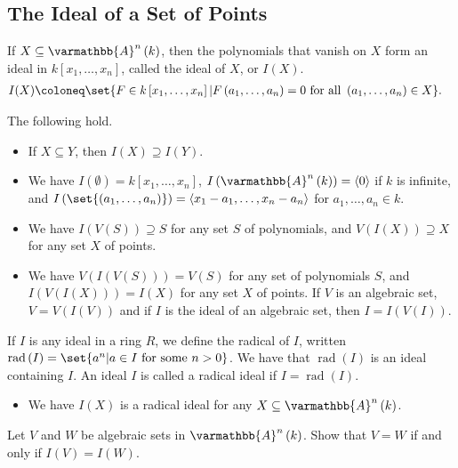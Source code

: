 \documentclass[10pt]{mypackage}
\renewcommand*{\mathbb}[1]{\varmathbb{#1}}
\newcommand{\A}{\mathbb{A}}
\begin{document}
\subsection{The Ideal of a Set of Points}%
\begin{definition}
  If $X\subseteq \A^n\left(k\right)$, then the polynomials that vanish on $X$ form an ideal in $k\left[x_1,\dots,x_n\right]$, called the ideal of $X$, or $I(X)$.
  \begin{align*}
    I(X) &\coloneq \set{F\in k\left[x_1,\dots,x_n\right] | F\left(a_1,\dots,a_n\right) = 0\text{ for all }\left(a_1,\dots,a_n\right)\in X}.
  \end{align*}
\end{definition}
The following hold.
\begin{itemize}
  \item If $X\subseteq Y$, then $I(X)\supseteq I(Y)$.
  \item We have $I\left(\emptyset\right) = k\left[x_1,\dots,x_n\right]$, $I\left(\A^n\left(k\right)\right) = \left\langle 0 \right\rangle$ if $k$ is infinite, and $I\left(\set{\left(a_1,\dots,a_n\right)}\right) = \left\langle x_1-a_1,\dots,x_n-a_n \right\rangle$ for $a_1,\dots,a_n\in k$.
  \item We have $I\left(V(S)\right) \supseteq S$ for any set $S$ of polynomials, and $V\left(I(X)\right)\supseteq X$ for any set $X$ of points.
  \item We have $V(I(V(S))) = V(S)$ for any set of polynomials $S$, and $I(V(I(X))) = I(X)$ for any set $X$ of points. If $V$ is an algebraic set, $V = V(I(V))$ and if $I$ is the ideal of an algebraic set, then $I = I(V(I))$.
\end{itemize}
\begin{definition}
  If $I$ is any ideal in a ring $R$, we define the radical of $I$, written $\operatorname{rad}\left(I\right) = \set{a^n | a\in I\text{ for some }n > 0}$. We have that $\operatorname{rad}\left(I\right)$ is an ideal containing $I$. An ideal $I$ is called a radical ideal if $I = \operatorname{rad}\left(I\right)$.
\end{definition}
\begin{itemize}
  \item We have $I(X)$ is a radical ideal for any $X\subseteq \A^n\left(k\right)$.
\end{itemize}
\begin{exercise}[Exercise 1.16]
Let $V$ and $W$ be algebraic sets in $\A^n\left(k\right)$. Show that $V = W$ if and only if $I(V) = I(W)$.
\end{exercise}
\end{document}
